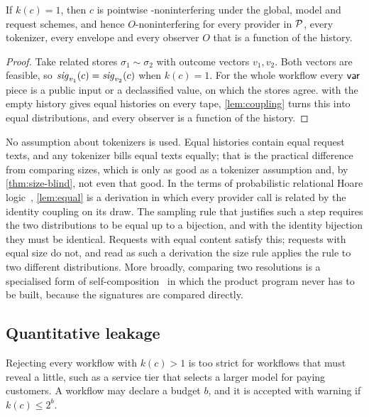 \begin{theorem}\label{thm:ni}
If $k(c) = 1$, then $c$ is pointwise -noninterfering under the global,
model and request schemes, and hence $O$-noninterfering for every provider in
$\mathcal{P}$, every tokenizer, every envelope and every observer $O$ that is a function
of the history.
\end{theorem}

\begin{proof}
Take related stores $\sigma_1 \sim \sigma_2$ with outcome vectors $v_1, v_2$. Both
vectors are feasible, so $\mathit{sig}_{v_1}(c) = \mathit{sig}_{v_2}(c)$ when $k(c) = 1$. For the
whole workflow every $\mathsf{var}$ piece is a public input or a declassified value, on
which the stores agree.  with the empty history gives equal histories
on every tape, \cref{lem:coupling} turns this into equal distributions, and every
observer is a function of the history.
\end{proof}

No assumption about tokenizers is used. Equal histories contain equal request
texts, and any tokenizer bills equal texts equally; that is the practical
difference from comparing sizes, which is only as good as a tokenizer assumption
and, by \cref{thm:size-blind}, not even that good. In the terms of probabilistic
relational Hoare logic~\cite{barthe2009formal}, \cref{lem:equal} is a derivation
in which every provider call is related by the identity coupling on its draw. The
sampling rule that justifies such a step requires the two distributions to be equal
up to a bijection, and with the identity bijection they must be identical. Requests
with equal content satisfy this; requests with equal size do not, and read as such
a derivation the size rule applies the rule to two different distributions. More broadly, comparing two resolutions is a specialised form of
self-composition~\cite{Barthe2004SelfComposition,Terauchi2005Safety,Barthe2016ProductPrograms}
in which the product program never has to be built, because the signatures are
compared directly.

\subsection{Quantitative leakage}\label{sec:quantitative}

Rejecting every workflow with $k(c) > 1$ is too strict for workflows that must reveal
a little, such as a service tier that selects a larger model for paying
customers. A workflow may declare a budget  $b$, and it is accepted with
warning  if $k(c) \leq 2^b$.

